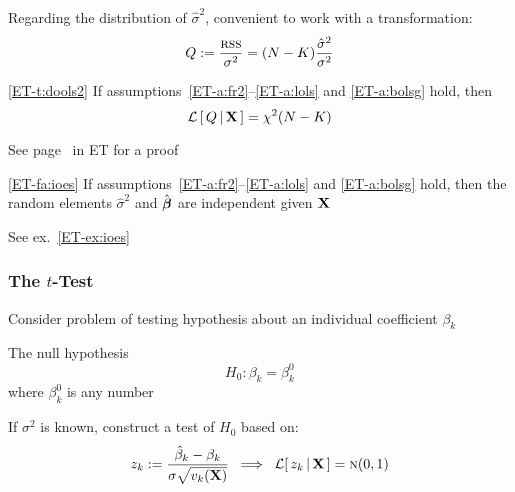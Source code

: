 \begin{frame}

    \vspace{2em}
    Regarding the distribution of $\hat \sigma^2$, convenient to work with a transformation:
    \begin{equation*}
        \label{eq:Q}
        Q := \frac{\textrm{{\sc rss}}}{\sigma^2}
        = (N-K) \frac{\hat \sigma^2}{\sigma^2}
    \end{equation*}
    
    \vspace{.7em}
    \Thm
        \eqref{ET-t:dools2}
        If assumptions~\ref{ET-a:fr2}--\ref{ET-a:lols} and \ref{ET-a:bolsg} hold,
        then
        \begin{equation*}
            \mathcal L \left[ \, Q \, | \, \mathbf X \, \right] = \chi^2(N - K)
        \end{equation*}
    
    See page~\pageref{ET-t:dools2} in ET for a proof
    
    \Fact
    \eqref{ET-fa:ioes}
    If assumptions~\ref{ET-a:fr2}--\ref{ET-a:lols} and \ref{ET-a:bolsg} hold,
    then the random elements $\hat \sigma^2$ and
    $\hat {\boldsymbol \beta}$ are independent given $\mathbf X$ 
    
    See ex.~\ref{ET-ex:ioes}
    
\end{frame}


\begin{frame}\frametitle{The $t$-Test}

    \vspace{2em}
    Consider problem of testing hypothesis about an individual 
    coefficient $\beta_k$
    
    The null hypothesis
    \begin{equation*}
        H_0 \colon \beta_k = \beta_k^0
    \end{equation*}
    where $\beta_k^0$ is any number
    
    \vspace{.7em}
    If $\sigma^2$ is known, construct a
    test of $H_0$ based on:
    \begin{equation}
        \label{eq:istn}
        z_k := \frac{\hat \beta_k - \beta_k} { \sigma \sqrt{v_k(\mathbf X)} }
        \; \implies \;
        \mathcal L [ \, z_k \, | \, \mathbf X \, ]
            = \textrm{\sc n}(0, 1)
    \end{equation}

\end{frame}

